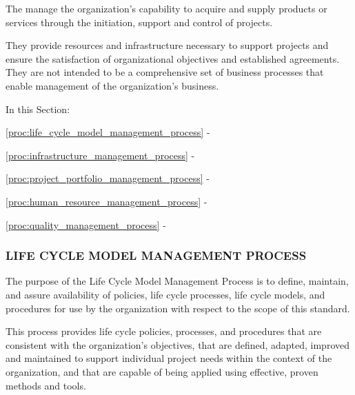 		\begin{adjustwidth}{1em}{0pt}

			The  manage the organization's capability to acquire and supply products or services through the initiation, support and control of projects. 

			They provide resources and infrastructure necessary to support projects and ensure the satisfaction of organizational objectives and established agreements. They are not intended to be a comprehensive set of business processes that enable management of the organization's business.

			In this Section:

			\begin{compactitem}

				\item \ref{proc:life_cycle_model_management_process} - 

				\item \ref{proc:infrastructure_management_process} - 

				\item \ref{proc:project_portfolio_management_process} - 

				\item \ref{proc:human_resource_management_process} - 

				\item \ref{proc:quality_management_process} - 
			
			\end{compactitem}

		\end{adjustwidth}

		\newpage
		\subsubsection{LIFE CYCLE MODEL MANAGEMENT PROCESS\label{proc:life_cycle_model_management_process}}

			\begin{adjustwidth}{2em}{0pt} 

				The purpose of the Life Cycle Model Management Process is to define, maintain, and assure availability of policies, life cycle processes, life cycle models, and procedures for use by the organization with respect to the scope of this standard.

				This process provides life cycle policies, processes, and procedures that are consistent with the organization's objectives, that are defined, adapted, improved and maintained to support individual project needs within the context of the organization, and that are capable of being applied using effective, proven methods and tools.


			\end{adjustwidth}

